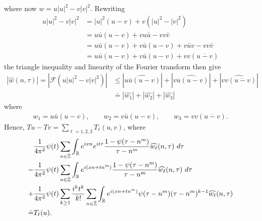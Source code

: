 \documentclass[12pt,reqno]{amsart}
\numberwithin{equation}{section}  %
\numberwithin{figure}{section}
\newcommand{\rr}{\mathbb{R}}
\newcommand{\zz}{\mathbb{Z}}
\newcommand{\zzdot}{\dot{\zz}}
\newcommand{\wh}{\widehat}
\theoremstyle{plain}
\theoremstyle{definition}
\theoremstyle{remark}
\begin{document}
%
where now $w = u | u |^2 - v | v |^{2}$. Rewriting
%
\begin{equation*}
	\begin{split}
		u | u |^{2} - v | v |^{2}
		& = | u |^2 \left( u -v \right) + v\left( | u 
		|^2 - | v |^2
		\right)
		\\
		& = u \bar u \left( u -v \right) + v u \bar u - v v \bar v
		\\
		& = u \bar u \left( u - v \right) + v \bar u\left( u - v \right) + v 
		\bar u v - v v \bar v
		\\
		& = u \bar u \left( u -v \right) + v \bar u\left( u - v \right) + v v 
		\left( \overline{u -v} \right)
	\end{split}
\end{equation*}
%
the triangle inequality and linearity of the Fourier transform then give
%
\begin{equation*}
	\begin{split}
		| \wh{w}(n, \tau) | = | \mathcal{F}(u | u |^2 - v| v |^2) |
		& \le | \wh{u \overline{u} \left (u -v \right )} | +
		| \wh{v \overline{u} (u -v)} | + |\wh{v v 
		(\overline{u-v})}|
		\\
		& \doteq | \wh{w_1} | + | \wh{w_2} | + | \wh{w_3} |
	\end{split}
\end{equation*}
%
where
%
\begin{equation*}
	\begin{split}
		w_1 = u \bar u \left( u -v \right), \qquad w_2 = v \bar u \left( u -v 
		\right), \qquad w_3 = v v \left( \overline{u -v} \right).
	\end{split}
\end{equation*}
%
Hence, $Tu - Tv = \sum_{\ell=1, 2, 3} 
T_\ell(u, v)$, where
\begin{align}
	\label{main-int-exp-mod1}
	& \frac{1}{4 \pi^2} \psi(t) \sum_{n\in \zzdot} \int_\rr e^{ixn}  
		e^{it \tau} \frac{ 1 - \psi(\tau - n^{m}) 
		}{\tau - n^{m}} \wh{w_\ell}(n, \tau) \ d \tau
		\\
		\label{main-int-exp-mod2}
		- & \frac{1}{4 \pi^2} \psi(t) \sum_{n\in \zzdot} \int_\rr e^{i(xn + 
		tn^{m})}
		 \frac{1- \psi(\tau - n^{m})}{\tau - n^{m}} \wh{w_\ell}(n, \tau) \ d \tau
		\\
		\label{main-int-exp-mod3}
		+ & \frac{1}{4 \pi^2} \psi(t) \sum_{k \ge 1} \frac{i^k t^k}{k!}
		\sum_{n \in \zzdot} \int_\rr e^{i(xn + tn^{m} )}
		\psi(\tau - n^{m}) (\tau - n^{m})^{k-1} \wh{w_\ell}(n, \tau)  
		\\
		\doteq & T_\ell(u). \notag
\end{align}
\end{document}
